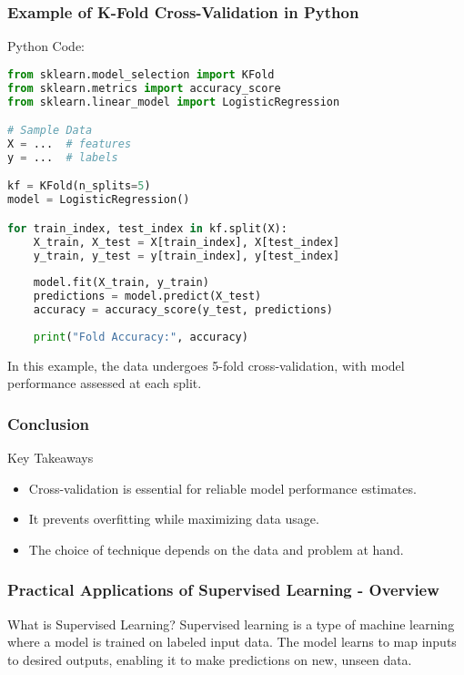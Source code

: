 \documentclass[aspectratio=169]{beamer}
\begin{document}
\begin{frame}[fragile]
    \frametitle{Example of K-Fold Cross-Validation in Python}
    \begin{block}{Python Code:}
    \begin{lstlisting}[language=Python]
from sklearn.model_selection import KFold
from sklearn.metrics import accuracy_score
from sklearn.linear_model import LogisticRegression

# Sample Data
X = ...  # features
y = ...  # labels

kf = KFold(n_splits=5)
model = LogisticRegression()

for train_index, test_index in kf.split(X):
    X_train, X_test = X[train_index], X[test_index]
    y_train, y_test = y[train_index], y[test_index]
    
    model.fit(X_train, y_train)
    predictions = model.predict(X_test)
    accuracy = accuracy_score(y_test, predictions)
    
    print("Fold Accuracy:", accuracy)
    \end{lstlisting}
    \end{block}

    In this example, the data undergoes 5-fold cross-validation, with model performance assessed at each split.
\end{frame}

\begin{frame}[fragile]
    \frametitle{Conclusion}
    \begin{block}{Key Takeaways}
        \begin{itemize}
            \item Cross-validation is essential for reliable model performance estimates.
            \item It prevents overfitting while maximizing data usage.
            \item The choice of technique depends on the data and problem at hand.
        \end{itemize}
    \end{block}
\end{frame}

\begin{frame}[fragile]
    \frametitle{Practical Applications of Supervised Learning - Overview}
    \begin{block}{What is Supervised Learning?}
        Supervised learning is a type of machine learning where a model is trained on labeled input data. The model learns to map inputs to desired outputs, enabling it to make predictions on new, unseen data.
    \end{block}
\end{frame}
\end{document}
